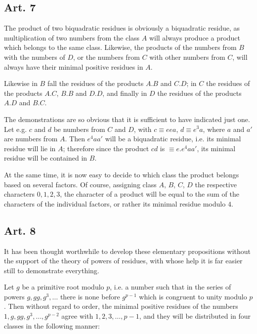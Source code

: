 \documentclass{book}
\theoremstyle{plain}
\theoremstyle{remark}
\begin{document}
\subsection*{Art. 7} 

The product of two biquadratic residues is obviously a biquadratic residue, as multiplication of two numbers from the class $A$ will always produce a product which belongs to the same class.  Likewise, the products of the numbers from $B$ with the numbers of $D$, or the numbers from $C$ with other numbers from $C$, will always have their minimal positive residues in $A$. 

Likewise in $B$ fall the residues of the products $A.B$ and $C.D$; in $C$ the residues of the products $A.C$, $B.B$ and $D.D$, and finally in $D$ the residues of the products $A.D$ and $B.C$.  

The demonstrations are so obvious that it is sufficient to have indicated just one.  Let e.g. $c$ and $d$ be numbers from $C$ and $D$, with $c \equiv eea$, $d \equiv e^3a$, where $a$ and $a'$ are numbers from $A$.  Then $e^4aa'$ will be a biquadratic residue, i.e. its minimal residue will lie in $A$;  therefore since the product $cd$ is $\equiv e.e^4aa' $, its minimal residue will be contained in $B$. 

At the same time, it is now easy to decide to which class the product belongs based on several factors.  Of course, assigning class $A$, $B$, $C$, $D$ the respective characters $0, 1, 2, 3$, the character of a product will be equal to the sum of the characters of the individual factors, or rather its minimal residue modulo $4$.  

\subsection*{Art. 8}

It has been thought worthwhile to develop these elementary propositions without the support of the theory of powers of residues, with whose help it is far easier still to demonstrate everything.

Let $g$ be a primitive root modulo $p$, i.e. a number such that in the series of powers $g, gg, g^3,\dots$ there is none before $g^{p-1}$ which is congruent to unity modulo $p$.  Then without regard to order, the minimal positive residues of the numbers $1, g, gg, g^3,\dots, g^{p-2}$ agree with $1,2,3,\dots,p-1$, and they will be distributed in four classes in the following manner:
\end{document}
